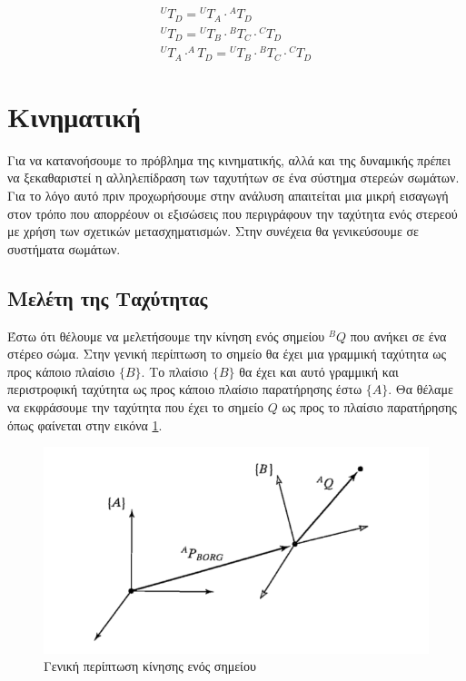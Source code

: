 \begin{equation}
    \begin{aligned}
        ^UT_D = {}^UT_A \cdot {}^AT_D\\[10pt]
        ^UT_D = {}^UT_B \cdot {}^BT_C \cdot {}^CT_D\\[10pt]
        ^UT_A \cdot ^AT_D = {}^UT_B \cdot {}^BT_C \cdot {}^CT_D
    \end{aligned}
    \label{equ:chain}
\end{equation}

\section{Κινηματική}

Για να κατανοήσουμε το πρόβλημα της κινηματικής, αλλά και της δυναμικής πρέπει να ξεκαθαριστεί η αλληλεπίδραση των ταχυτήτων σε ένα σύστημα στερεών σωμάτων. Για το λόγο αυτό πριν προχωρήσουμε στην ανάλυση απαιτείται μια μικρή εισαγωγή στον τρόπο που απορρέουν οι εξισώσεις που περιγράφουν την ταχύτητα ενός στερεού με χρήση των σχετικών μετασχηματισμών. Στην συνέχεια θα γενικεύσουμε σε συστήματα σωμάτων.

\subsection{Μελέτη της Ταχύτητας}

Έστω ότι θέλουμε να μελετήσουμε την κίνηση ενός σημείου $^BQ$ που ανήκει σε ένα στέρεο σώμα. Στην γενική περίπτωση το σημείο θα έχει μια γραμμική ταχύτητα ως προς κάποιο πλαίσιο $\{Β\}$. Το πλαίσιο $\{Β\}$ θα έχει και αυτό γραμμική και περιστροφική ταχύτητα ως προς κάποιο πλαίσιο παρατήρησης έστω $\{Α\}$. Θα θέλαμε να εκφράσουμε την ταχύτητα που έχει το σημείο $Q$ ως προς το πλαίσιο παρατήρησης όπως φαίνεται στην εικόνα \ref{fig:velocity}.

\begin{figure}[H]
    \centering
    \includegraphics[width=.8\textwidth, keepaspectratio]{fig/velocity.png}
    \caption{Γενική περίπτωση κίνησης ενός σημείου \cite{craig95}}
    \label{fig:velocity}
\end{figure}

